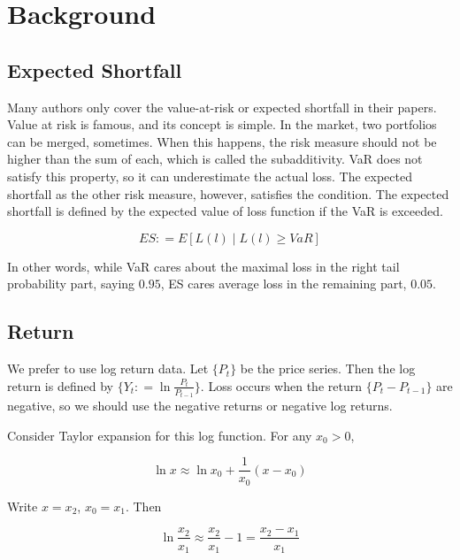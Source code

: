\documentclass[
]{article}
\theoremstyle{definition}
\theoremstyle{definition}
\theoremstyle{definition}
\theoremstyle{remark}
\begin{document}
\hypertarget{background}{%
\section{Background}\label{background}}

\hypertarget{expected-shortfall}{%
\subsection{Expected Shortfall}\label{expected-shortfall}}

Many authors only cover the value-at-risk or expected shortfall in their papers. Value at risk is famous, and its concept is simple. In the market, two portfolios can be merged, sometimes. When this happens, the risk measure should not be higher than the sum of each, which is called the subadditivity. VaR does not satisfy this property, so it can underestimate the actual loss. The expected shortfall as the other risk measure, however, satisfies the condition. The expected shortfall is defined by the expected value of loss function if the VaR is exceeded.

\begin{equation}
  ES \mathpunct{:}=E \left[ L(l) \mid L(l) \ge VaR \right]
  \label{eq:esdef}
\end{equation}

In other words, while VaR cares about the maximal loss in the right tail probability part, saying \(0.95\), ES cares average loss in the remaining part, \(0.05\).

\hypertarget{return}{%
\subsection{Return}\label{return}}

We prefer to use log return data. Let \(\{ P_t \}\) be the price series. Then the log return is defined by \(\{ Y_t \mathpunct{:}=\ln \frac{P_t}{P_{t - 1}} \}\). Loss occurs when the return \(\{ P_t - P_{t - 1} \}\) are negative, so we should use the negative returns or negative log returns.

Consider Taylor expansion for this log function. For any \(x_0 > 0\),

\begin{equation}
  \ln x \approx \ln x_0 + \frac{1}{x_0}(x - x_0)
\end{equation}

Write \(x = x_2\), \(x_0 = x_1\). Then

\begin{equation}
  \ln \frac{x_2}{x_1} \approx \frac{x_2}{x_1} - 1 = \frac{x_2 - x_1}{x_1}
  \label{eq:logpercent}
\end{equation}
\end{document}
